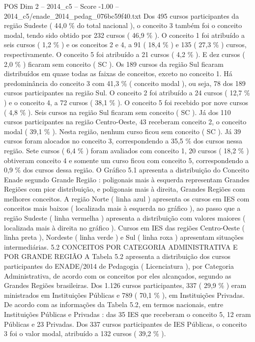 \begin{textsample}{POS Dim 2 – 2014\_c5 – Score -1.00 – 2014\_c5/enade\_2014\_pedag\_076bc59f40.txt}
Dos 495 cursos participantes da região Sudeste ( 44,0 \% do total nacional ), o conceito 3 também foi o conceito modal, tendo sido obtido por 232 cursos ( 46,9 \% ).
O conceito 1 foi atribuído a seis cursos ( 1,2 \% ) e os conceitos 2 e 4, a 91 ( 18,4 \% ) e 135 ( 27,3 \% ) cursos, respectivamente.
O conceito 5 foi atribuído a 21 cursos ( 4,2 \% ).
E dez cursos ( 2,0 \% ) ficaram sem conceito ( SC ).
Os 189 cursos da região Sul ficaram distribuídos em quase todas as faixas de conceitos, exceto no conceito 1.
Há predominância do conceito 3 com 41,3 \% ( conceito modal ), ou seja, 78 dos 189 cursos participantes na região Sul.
O conceito 2 foi atribuído a 24 cursos ( 12,7 \% ) e o conceito 4, a 72 cursos ( 38,1 \% ).
O conceito 5 foi recebido por nove cursos ( 4,8 \% ).
Seis cursos na região Sul ficaram sem conceito ( SC ).
Já dos 110 cursos participantes na região Centro-Oeste, 43 receberam conceito 2, o conceito modal ( 39,1 \% ).
Nesta região, nenhum curso ficou sem conceito ( SC ).
Já 39 cursos foram alocados no conceito 3, correspondendo a 35,5 \% dos cursos nessa região.
Sete cursos ( 6,4 \% ) foram avaliados com conceito 1, 20 cursos ( 18,2 \% ) obtiveram conceito 4 e somente um curso ficou com conceito 5, correspondendo a 0,9 \% dos cursos dessa região.
O Gráfico 5.1 apresenta a distribuição do Conceito Enade segundo Grande Região : poligonais mais à esquerda representam Grandes Regiões com pior distribuição, e poligonais mais à direita, Grandes Regiões com melhores conceitos.
A região Norte ( linha azul ) apresenta os cursos em IES com conceitos mais baixos ( localizada mais à esquerda no gráfico ), ao passo que a região Sudeste ( linha vermelha ) apresenta a distribuição com valores maiores ( localizada mais à direita no gráfico ).
Cursos em IES das regiões Centro-Oeste ( linha preta ), Nordeste ( linha verde ) e Sul ( linha roxa ) apresentam situações intermediárias. 5.2 CONCEITOS POR CATEGORIA ADMINISTRATIVA E POR GRANDE REGIÃO A Tabela 5.2 apresenta a distribuição dos cursos participantes do ENADE/2014 de Pedagogia ( Licenciatura ), por Categoria Administrativa, de acordo com os conceitos por eles alcançados, segundo as Grandes Regiões brasileiras.
Dos 1.126 cursos participantes, 337 ( 29,9 \% ) eram ministrados em Instituições Públicas e 789 ( 70,1 \% ), em Instituições Privadas.
De acordo com as informações da Tabela 5.2, em termos nacionais, entre Instituições Públicas e Privadas : das 35 IES que receberam o conceito 5, 12 eram Públicas e 23 Privadas.
Dos 337 cursos participantes de IES Públicas, o conceito 3 foi o valor modal, atribuído a 132 cursos ( 39,2 \% ).

\end{textsample}
